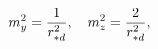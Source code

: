 \begin{equation}
m^{2}_{y}={1\over r_{*d}^{2}},\quad
m^{2}_{z}={2\over r_{*d}^{2}},
\label{eq:massdec}
\end{equation}

